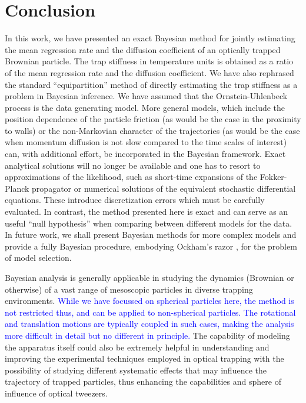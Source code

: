 \documentclass[fleqn,10pt]{wlscirep}
\begin{document}
\section*{Conclusion}
\label{sec:Conclusion}In this work, we have presented an exact Bayesian
method for jointly estimating the mean regression rate and the diffusion
coefficient of an optically trapped Brownian particle. The trap stiffness
in temperature units is obtained as a ratio of the mean regression
rate and the diffusion coefficient. We have also rephrased the standard
``equipartition'' method of directly estimating the trap stiffness
as a problem in Bayesian inference. We have assumed that the Ornstein-Uhlenbeck
process is the data generating model. More general models, which include
the position dependence of the particle friction (as would be the
case in the proximity to walls) or the non-Markovian character of
the trajectories (as would be the case when momentum diffusion is
not slow compared to the time scales of interest) can, with additional
effort, be incorporated in the Bayesian framework. Exact analytical
solutions will no longer be available and one has to resort to approximations
of the likelihood, such as short-time expansions of the Fokker-Planck
propagator or numerical solutions of the equivalent stochastic differential
equations. These introduce discretization errors which must be carefully
evaluated. In contrast, the method presented here is exact and can
serve as an useful ``null hypothesis'' when comparing between different
models for the data. In future work, we shall present Bayesian methods
for more complex models and provide a fully Bayesian procedure, embodying
Ockham's razor \cite{jaynes2003probability}, for the problem of model
selection. 

Bayesian analysis is generally applicable in studying the dynamics
(Brownian or otherwise) of a vast range of mesoscopic particles in
diverse trapping environments. \textcolor{blue}{While we have focussed
on spherical particles here, the method is not restricted thus, and
can be applied to non-spherical particles. The rotational and translation
motions are typically coupled in such cases, making the analysis more
difficult in detail but no different in principle. }The capability
of modeling the apparatus itself could also be extremely helpful in
understanding and improving the experimental techniques employed in
optical trapping with the possibility of studying different systematic
effects that may influence the trajectory of trapped particles, thus
enhancing the capabilities and sphere of influence of optical tweezers.
\end{document}
